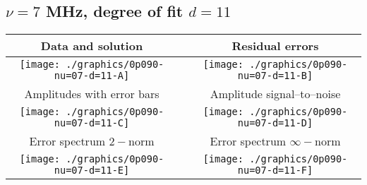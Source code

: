 

% 

\clearpage{}
\break{}

\subsection{$\nu = 7$ MHz, degree of fit $d = 11$}

\begin{table}[h]
    \begin{center}
        \begin{tabular}{ccc}
            Data and solution & \quad & Residual errors \\\hline
            \texttt{[image: ./graphics/0p090-nu=07-d=11-A]} &&
            \texttt{[image: ./graphics/0p090-nu=07-d=11-B]} \\[15pt]
            Amplitudes with error bars && Amplitude signal--to--noise \\\hline
            \texttt{[image: ./graphics/0p090-nu=07-d=11-C]} &&
            \texttt{[image: ./graphics/0p090-nu=07-d=11-D]} \\[15pt]
            Error spectrum $2-$norm && Error spectrum $\infty-$norm \\\hline
            \texttt{[image: ./graphics/0p090-nu=07-d=11-E]} &&
            \texttt{[image: ./graphics/0p090-nu=07-d=11-F]} \\[15pt]
        \end{tabular}
    \end{center}
\label{fig:elev=90, nu=7}
\end{table}



\endinput
